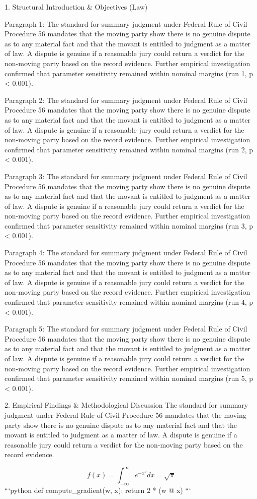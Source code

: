 1. Structural Introduction & Objectives (Law)


Paragraph 1: The standard for summary judgment under Federal Rule of Civil Procedure 56 mandates that the moving party show there is no genuine dispute as to any material fact and that the movant is entitled to judgment as a matter of law. A dispute is genuine if a reasonable jury could return a verdict for the non-moving party based on the record evidence. Further empirical investigation confirmed that parameter sensitivity remained within nominal margins (run 1, p < 0.001).

Paragraph 2: The standard for summary judgment under Federal Rule of Civil Procedure 56 mandates that the moving party show there is no genuine dispute as to any material fact and that the movant is entitled to judgment as a matter of law. A dispute is genuine if a reasonable jury could return a verdict for the non-moving party based on the record evidence. Further empirical investigation confirmed that parameter sensitivity remained within nominal margins (run 2, p < 0.001).

Paragraph 3: The standard for summary judgment under Federal Rule of Civil Procedure 56 mandates that the moving party show there is no genuine dispute as to any material fact and that the movant is entitled to judgment as a matter of law. A dispute is genuine if a reasonable jury could return a verdict for the non-moving party based on the record evidence. Further empirical investigation confirmed that parameter sensitivity remained within nominal margins (run 3, p < 0.001).

Paragraph 4: The standard for summary judgment under Federal Rule of Civil Procedure 56 mandates that the moving party show there is no genuine dispute as to any material fact and that the movant is entitled to judgment as a matter of law. A dispute is genuine if a reasonable jury could return a verdict for the non-moving party based on the record evidence. Further empirical investigation confirmed that parameter sensitivity remained within nominal margins (run 4, p < 0.001).

Paragraph 5: The standard for summary judgment under Federal Rule of Civil Procedure 56 mandates that the moving party show there is no genuine dispute as to any material fact and that the movant is entitled to judgment as a matter of law. A dispute is genuine if a reasonable jury could return a verdict for the non-moving party based on the record evidence. Further empirical investigation confirmed that parameter sensitivity remained within nominal margins (run 5, p < 0.001).


2. Empirical Findings & Methodological Discussion
The standard for summary judgment under Federal Rule of Civil Procedure 56 mandates that the moving party show there is no genuine dispute as to any material fact and that the movant is entitled to judgment as a matter of law. A dispute is genuine if a reasonable jury could return a verdict for the non-moving party based on the record evidence.

$$ f(x) = \int_{-\infty}^{\infty} e^{-x^2} dx = \sqrt{\pi} $$ 
```python
def compute_gradient(w, x):
    return 2 * (w @ x)
```